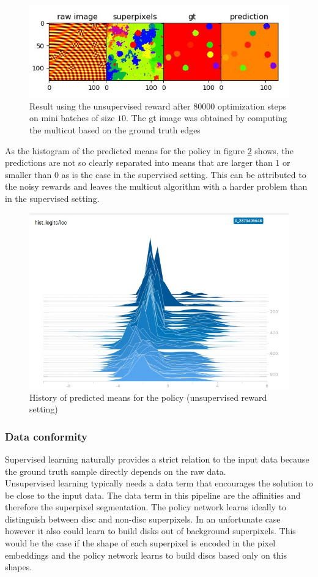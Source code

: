 \begin{figure}[ht!]
	\centering
	\includegraphics[width=.8\textwidth]{figures/plots/res_unsup.jpeg}
	\caption{Result using the unsupervised reward after $80000$ optimization steps on mini batches of size $10$. The gt image was obtained by computing the multicut based on the ground truth edges}
	\label{fig:resa_dice}
\end{figure}
As the histogram of the predicted means for the policy in figure \ref{fig:resa_dice} shows, the predictions are not so clearly separated into means that are larger than $1$ or smaller than $0$ as is the case in the supervised setting. This can be attributed to the noisy rewards and leaves the multicut algorithm with a harder problem than in the supervised setting.\\

\begin{figure}[ht!]
	\centering
	\includegraphics[width=.6\textwidth]{figures/plots/hist_unsup.jpeg}
	\caption{History of predicted means for the policy (unsupervised reward setting)}
	\label{fig:resa_dice}
\end{figure}

\subsubsection{Data conformity}
Supervised learning naturally provides a strict relation to the input data because the ground truth sample directly depends on the raw data.\\
Unsupervised learning typically needs a data term that encourages the solution to be close to the input data. The data term in this pipeline are the affinities and therefore the superpixel segmentation. The policy network learns ideally to distinguish between disc and non-disc superpixels. In an unfortunate case however it also could learn to build disks out of background superpixels. This would be the case if the shape of each superpixel is encoded in the pixel embeddings and the policy network learns to build discs based only on this shapes.


